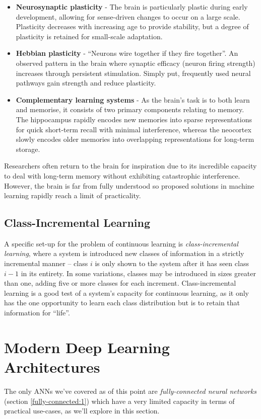 \documentclass{report}
\begin{document}
	\begin{itemize}
		\item\textbf{Neurosynaptic plasticity} - The brain is particularly plastic during early development, allowing for sense-driven changes to occur on a large scale. Plasticity decreases with increasing age to provide stability, but a degree of plasticity is retained for small-scale adaptation.
		\item\textbf{Hebbian plasticity}\parencite{hebbian}\label{hebbian:1} - ``Neurons wire together if they fire together''\parencite{wirefire}. An observed pattern in the brain where synaptic efficacy (neuron firing strength) increases through persistent stimulation. Simply put, frequently used neural pathways gain strength and reduce plasticity.
		\item\textbf{Complementary learning systems} - As the brain's task is to both learn and memorise, it consists of two primary components relating to memory. The hippocampus rapidly encodes new memories into sparse representations for quick short-term recall with minimal interference, whereas the neocortex slowly encodes older memories into overlapping representations for long-term storage.
	\end{itemize}
	Researchers often return to the brain for inspiration due to its incredible capacity to deal with long-term memory without exhibiting catastrophic interference. However, the brain is far from fully understood so proposed solutions in machine learning rapidly reach a limit of practicality. \par
	
	\subsection{Class-Incremental Learning} \label{cil}
	A specific set-up for the problem of continuous learning is \emph{class-incremental learning}, where a system is introduced new classes of information in a strictly incremental manner -- class $i$ is only shown to the system after it has seen class $i-1$ in its entirety. In some variations, classes may be introduced in sizes greater than one, adding five or more classes for each increment. Class-incremental learning is a good test of a system's capacity for continuous learning, as it only has the one opportunity to learn each class distribution but is to retain that information for ``life''. \par

	\section{Modern Deep Learning Architectures} \label{modern-dl:1}
	The only ANNs we've covered as of this point are \textit{fully-connected neural networks} (section \ref{fully-connected:1}) which have a very limited capacity in terms of practical use-cases, as we'll explore in this section. \par
	
\end{document}
